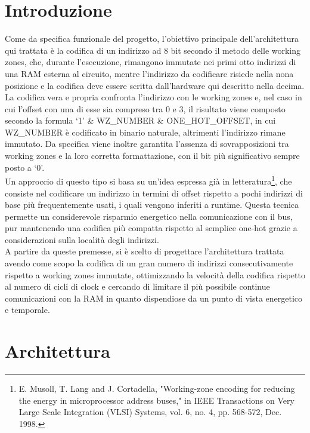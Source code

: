 \documentclass[10pt,english, openany]{book}
\begin{document}
\chapter{Introduzione}\label{chapt:sum}


Come da specifica funzionale del progetto, l’obiettivo principale dell’architettura qui trattata è la codifica di un indirizzo ad 8 bit secondo il metodo delle working zones, che, durante l’esecuzione, rimangono immutate nei primi otto indirizzi di una RAM esterna al circuito, mentre l’indirizzo da codificare risiede nella nona posizione e la codifica deve essere scritta dall’hardware qui descritto nella decima. La codifica vera e propria confronta l’indirizzo con le working zones e, nel caso in cui l’offset con una di esse sia compreso tra 0 e 3, il risultato viene composto secondo la formula ‘1’ \& WZ\_NUMBER \& ONE\_HOT\_OFFSET, in cui WZ\_NUMBER è codificato in binario naturale, altrimenti l’indirizzo rimane immutato. Da specifica viene inoltre garantita l’assenza di sovrapposizioni tra working zones e la loro corretta formattazione, con il bit più significativo sempre posto a ‘0’.\\
Un approccio di questo tipo si basa su un’idea espressa già in letteratura\footnote{\label{paper_citation}E. Musoll, T. Lang and J. Cortadella, "Working-zone encoding for reducing the energy in microprocessor address buses," in IEEE Transactions on Very Large Scale Integration (VLSI) Systems, vol. 6, no. 4, pp. 568-572, Dec. 1998.}, che consiste nel codificare un indirizzo in termini di offset rispetto a pochi indirizzi di base più frequentemente usati, i quali vengono inferiti a runtime. Questa tecnica permette un considerevole risparmio energetico nella comunicazione con il bus, pur mantenendo una codifica più compatta rispetto al semplice one-hot grazie a considerazioni sulla località degli indirizzi.\\
A partire da queste premesse, si è scelto di progettare l'architettura trattata avendo come scopo la codifica di un gran numero di indirizzi consecutivamente rispetto a working zones immutate, ottimizzando la velocità della codifica rispetto al numero di cicli di clock e cercando di limitare il più possibile continue comunicazioni con la RAM in quanto dispendiose da un punto di vista energetico e temporale.

\chapter{Architettura}
\end{document}

